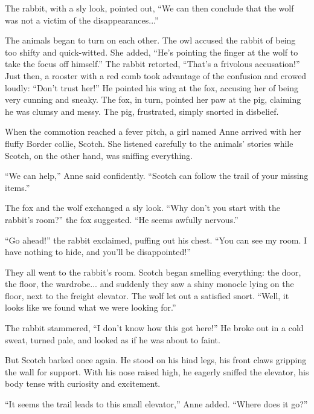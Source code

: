 The rabbit, with a sly look, pointed out, ``We can then conclude that the wolf was not a victim of the disappearances...''

The animals began to turn on each other. The owl accused the rabbit of being too shifty and quick-witted. She added, ``He's pointing the finger at the wolf to take the focus off himself.'' The rabbit retorted, ``That's a frivolous accusation!'' Just then, a rooster with a red comb took advantage of the confusion and crowed loudly: ``Don't trust her!'' He pointed his wing at the fox, accusing her of being very cunning and sneaky. The fox, in turn, pointed her paw at the pig, claiming he was clumsy and messy. The pig, frustrated, simply snorted in disbelief.

When the commotion reached a fever pitch, a girl named Anne arrived with her fluffy Border collie, Scotch. She listened carefully to the animals' stories while Scotch, on the other hand, was sniffing everything.

``We can help,'' Anne said confidently. ``Scotch can follow the trail of your missing items.''

The fox and the wolf exchanged a sly look. ``Why don't you start with the rabbit's room?'' the fox suggested. ``He seems awfully nervous.''

``Go ahead!'' the rabbit exclaimed, puffing out his chest. ``You can see my room. I have nothing to hide, and you'll be disappointed!''

\clearpage


They all went to the rabbit's room. Scotch began smelling everything: the door, the floor, the wardrobe... and suddenly they saw a shiny monocle lying on the floor, next to the freight elevator. The wolf let out a satisfied snort. ``Well, it looks like we found what we were looking for.''

The rabbit stammered, ``I don't know how this got here!'' He broke out in a cold sweat, turned pale, and looked as if he was about to faint.

But Scotch barked once again. He stood on his hind legs, his front claws gripping the wall for support. With his nose raised high, he eagerly sniffed the elevator, his body tense with curiosity and excitement.

``It seems the trail leads to this small elevator,'' Anne added. ``Where does it go?''

